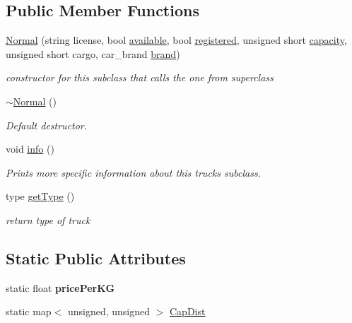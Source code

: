 \subsection*{Public Member Functions}
\begin{DoxyCompactItemize}
\item 
\hyperlink{class_normal_a76c1e0e53ac33cf89fc9969de59a122e}{Normal} (string license, bool \hyperlink{class_truck_a4189fe5ed32f6084459a9c5ae1eb7c2a}{available}, bool \hyperlink{class_truck_a80b8405cf7a15b236fef70116f99c4fb}{registered}, unsigned short \hyperlink{class_truck_ab004524786ae7aebf7c7bdb5e1599696}{capacity}, unsigned short cargo, car\+\_\+brand \hyperlink{class_truck_a4e30b27a9898eba7ac8404d25cbdd265}{brand})
\begin{DoxyCompactList}\small\item\em constructor for this subclass that calls the one from superclass \end{DoxyCompactList}\item 
\hyperlink{class_normal_a2ed547e3b7361c3675224d352cf79740}{$\sim$\+Normal} ()
\begin{DoxyCompactList}\small\item\em Default destructor. \end{DoxyCompactList}\item 
void \hyperlink{class_normal_ade6add2ee09e701113534c97e2a03307}{info} ()
\begin{DoxyCompactList}\small\item\em Prints more specific information about this truck\textquotesingle{}s subclass. \end{DoxyCompactList}\item 
type \hyperlink{class_normal_ae34be8332ea67df5fb0ae9b274884748}{get\+Type} ()
\begin{DoxyCompactList}\small\item\em return type of truck \end{DoxyCompactList}\end{DoxyCompactItemize}
\subsection*{Static Public Attributes}
\begin{DoxyCompactItemize}
\item 
\mbox{\label{class_normal_a8aae6212077e4f0c359d7fcfb5af3743}} 
static float {\bfseries price\+Per\+KG}
\item 
static map$<$ unsigned, unsigned $>$ \hyperlink{class_normal_a1ccae0db66db16a387c05009bf7194f8}{Cap\+Dist}
\end{DoxyCompactItemize}
